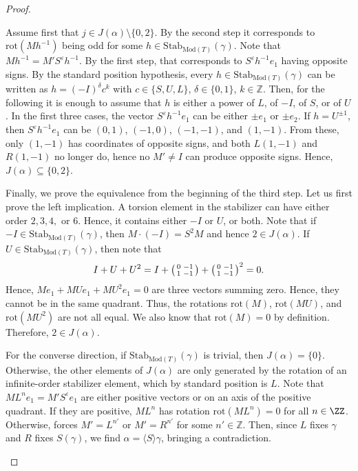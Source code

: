 \documentclass{article}
\begin{document}
\begin{proof}
\begin{enumerate}
            Assume first that $j\in J(\alpha)\setminus \{0,2\}$. By the second step it corresponds to $\mathrm{rot}(Mh^{-1})$ being odd for some $h\in\mathrm{Stab}_{\mathrm{Mod}(T)}(\gamma)$. Note that $Mh^{-1}=M'S^\varepsilon h^{-1}$. By the first step, that corresponds to $S^\varepsilon h^{-1}e_1$ having opposite signs. By the standard position hypothesis, every $h\in \mathrm{Stab}_{\mathrm{Mod}(T)}(\gamma)$ can be written as $h=(-I)^\delta c^k$ with $c\in \{S,U,L\}$, $\delta\in\{0,1\}$, $k\in\mathbb{Z}$. Then, for the following it is enough to assume that $h$ is either a power of $L$, of $-I$, of $S$, or of $U$. In the first three cases, the vector $S^\varepsilon h^{-1}e_1$ can be either $\pm e_1$ or $\pm e_2$. If $h=U^{\pm1}$, then $S^\varepsilon h^{-1}e_1$ can be $(0,1)$, $(-1,0)$, $(-1,-1)$, and $(1,-1)$. From these, only $(1,-1)$ has coordinates of opposite signs, and both $L(1,-1)$ and $R(1,-1)$ no longer do, hence no $M'\neq I$ can produce opposite signs. Hence, $J(\alpha)\subseteq \{0,2\}$.

            Finally, we prove the equivalence from the beginning of the third step. Let us first prove the left implication. A torsion element in the stabilizer can have either order $2,3,4,$ or $6$. Hence, it contains either $-I$ or $U$, or both. Note that if $-I\in\mathrm{Stab}_{\mathrm{Mod}(T)}(\gamma)$, then $M\cdot (-I)=S^2M$ and hence $2\in J(\alpha)$. If $U\in \mathrm{Stab}_{\mathrm{Mod}(T)}(\gamma)$, then note that
            \[
			I+U+U^2=I+\begin{psmallmatrix}
				0 & -1 \\ 1 & -1
			\end{psmallmatrix}+\begin{psmallmatrix}
				0 & -1 \\ 1 & -1
			\end{psmallmatrix}^2=0.
			\]
            Hence, $Me_1+MUe_1+MU^2e_1=0$ are three vectors summing zero. Hence, they cannot be in the same quadrant. Thus, the rotations $\mathrm{rot}(M)$, $\mathrm{rot}(MU)$, and $\mathrm{rot}(MU^2)$ are not all equal. We also know that $\mathrm{rot}(M)=0$ by definition. Therefore, $2\in J(\alpha)$. 

            For the converse direction, if $\mathrm{Stab}_{\mathrm{Mod}(T)}(\gamma)$ is trivial, then $J(\alpha)=\{0\}$. Otherwise, the other elements of $J(\alpha)$ are only generated by the rotation of an infinite-order stabilizer element, which by standard position is $L$. Note that $ML^ne_1=M'S^\varepsilon e_1$ are either positive vectors or on an axis of the positive quadrant. If they are positive, $ML^n$ has rotation $\mathrm{rot}(ML^n)=0$ for all $n\in\ZZ$. Otherwise, forces $M'=L^{n'}$ or $M'=R^{n'}$ for some $n'\in\mathbb{Z}$. Then, since $L$ fixes $\gamma$ and $R$ fixes $S(\gamma)$, we find $\alpha=\langle S\rangle \gamma$, bringing a contradiction. 
        \end{enumerate}

        \end{proof}
\end{document}

